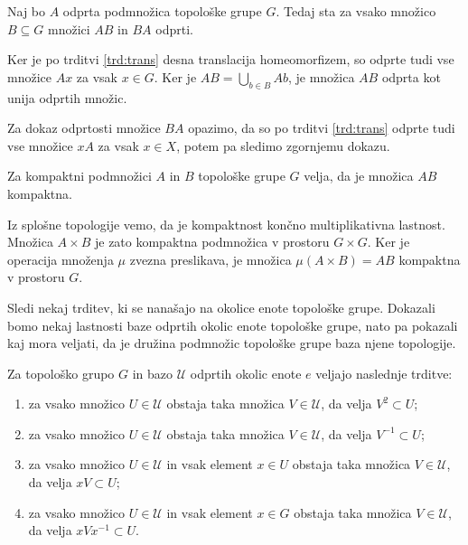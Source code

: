 \documentclass[mat1]{fmfdelo}
\newcommand{\Ucurl}{\mathcal{U}}
\begin{document}
\begin{trditev}\label{trd:prododp}
Naj bo $A$ odprta podmnožica topološke grupe $G$. Tedaj sta za vsako množico $B \subseteq G$ množici $AB$ in $BA$ odprti.
\end{trditev}

\begin{dokaz}
Ker je po trditvi \ref{trd:trans} desna translacija homeomorfizem, so odprte tudi vse množice $Ax$ za vsak $x \in G$. Ker je $AB = \bigcup_{b \in B}Ab$, je množica $AB$ odprta kot unija odprtih množic.

Za dokaz odprtosti množice $BA$ opazimo, da so po trditvi \ref{trd:trans} odprte tudi vse množice $xA$ za vsak $x \in X$, potem pa sledimo zgornjemu dokazu.
\end{dokaz}

\begin{trditev}\label{trd:prodkomp}
Za kompaktni podmnožici $A$ in $B$ topološke grupe $G$ velja, da je množica $AB$ kompaktna.
\end{trditev}

\begin{dokaz}
Iz splošne topologije vemo, da je kompaktnost končno multiplikativna lastnost. Množica $A \times B$ je zato kompaktna podmnožica v prostoru $G \times G$. Ker je operacija množenja $\mu$ zvezna preslikava, je množica $\mu (A \times B) = AB$ kompaktna v prostoru $G$.
\end{dokaz}

Sledi nekaj trditev, ki se nanašajo na okolice enote topološke grupe. Dokazali bomo nekaj lastnosti baze odprtih okolic enote topološke grupe, nato pa pokazali kaj mora veljati, da je družina podmnožic topološke grupe baza njene topologije.

\begin{trditev}\label{trd:okolice}
Za topološko grupo $G$ in bazo $\Ucurl$ odprtih okolic enote $e$ veljajo naslednje trditve:
\begin{enumerate}
\item za vsako množico $U \in \Ucurl$ obstaja taka množica $V \in \Ucurl$, da velja $V^{2} \subset U$;\label{last:oko1}
\item za vsako množico $U \in \Ucurl$ obstaja taka množica $V \in \Ucurl$, da velja $V^{-1} \subset U$;\label{last:oko2}
\item za vsako množico $U \in \Ucurl$ in vsak element $x \in U$ obstaja taka množica $V \in \Ucurl$, da velja $xV \subset U$; \label{last:oko3}
\item za vsako množico $U \in \Ucurl$ in vsak element $x \in G$ obstaja taka množica $V \in \Ucurl$, da velja $xVx^{-1} \subset U$.\label{last:oko4}
\end{enumerate}
\end{trditev}
\end{document}
